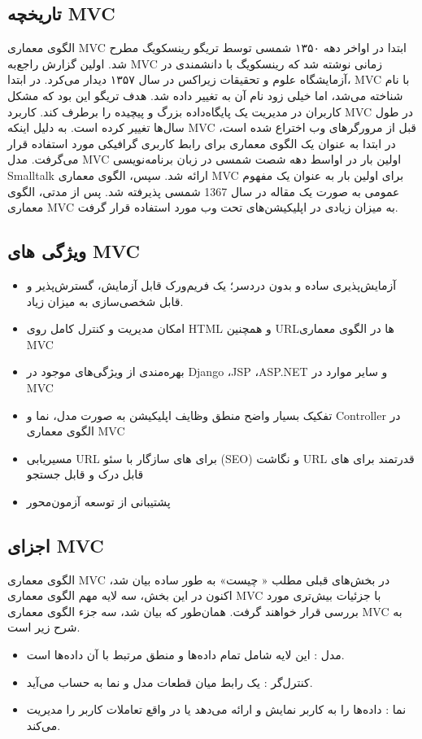 \subsection{تاریخچه MVC}
الگوی معماری MVC ابتدا در ‌اواخر دهه ۱۳۵۰ شمسی توسط 
تریگو رینسکویگ
 مطرح شد. اولین گزارش راجع‌به MVC زمانی نوشته شد که رینسکویگ با دانشمندی در آزمایشگاه علوم و تحقیقات 
 زیراکس
  در سال ۱۳۵۷ دیدار می‌کرد. در ابتدا، MVC با نام
 شناخته می‌شد، اما خیلی زود نام آن به
 تغییر داده شد. هدف تریگو این بود که مشکل کاربران در مدیریت یک پایگاه‌داده بزرگ و پیچیده را برطرف کند.
کاربرد MVC‌ در طول سال‌ها تغییر کرده است. به دلیل اینکه MVC‌ قبل از مرورگرهای وب اختراع شده است، در ابتدا به عنوان یک الگوی معماری برای رابط کاربری گرافیکی
 مورد استفاده قرار می‌گرفت. مدل MVC اولین بار در اواسط دهه شصت شمسی در زبان برنامه‌نویسی Smalltalk ارائه شد. سپس، الگوی معماری MVC برای اولین بار به عنوان یک مفهوم عمومی به صورت یک مقاله در سال 1367 شمسی پذیرفته شد. پس از مدتی، الگوی معماری MVC به میزان زیادی در اپلیکیشن‌های تحت وب مورد استفاده قرار گرفت.

\subsection{ویژگی های MVC}
\begin{itemize}
	\item
	آزمایش‌پذیری ساده و بدون دردسر؛ یک فریم‌ورک قابل آزمایش، گسترش‌پذیر و قابل شخصی‌سازی به میزان زیاد.
	\item
	امکان مدیریت و کنترل کامل روی HTML و همچنین URLها در الگوی معماری MVC
	\item
	بهره‌مندی از ویژگی‌های موجود در Django ،JSP ،ASP.NET و سایر موارد در MVC
	\item
	تفکیک بسیار واضح منطق وظایف اپلیکیشن به صورت مدل، نما و Controller‌ در الگوی معماری MVC
	\item
	مسیریابی URL‌ برای های سازگار با سئو (SEO) و نگاشت URL قدرتمند برای های قابل درک و قابل جستجو
	\item
	پشتیبانی از توسعه 
	آزمون‌محور
\end{itemize}


\subsection{اجزای MVC}
الگوی معماری MVC در بخش‌های قبلی مطلب « چیست» به طور ساده بیان شد، اکنون در این بخش، سه لایه مهم الگوی معماری MVC با جزئیات بیش‌تری مورد بررسی قرار خواهند گرفت. همان‌طور که بیان شد، سه جزء الگوی معماری MVC به شرح زیر است.
\begin{itemize}
	\item
	مدل
	: این لایه شامل تمام داده‌ها و منطق مرتبط با آن داده‌ها است.
	\item
	کنترل‌گر
	: یک رابط میان قطعات مدل و نما به حساب می‌آید.
	\item
	نما
	: داده‌ها را به کاربر نمایش و ارائه می‌دهد یا در واقع تعاملات کاربر را مدیریت می‌کند.
\end{itemize}

